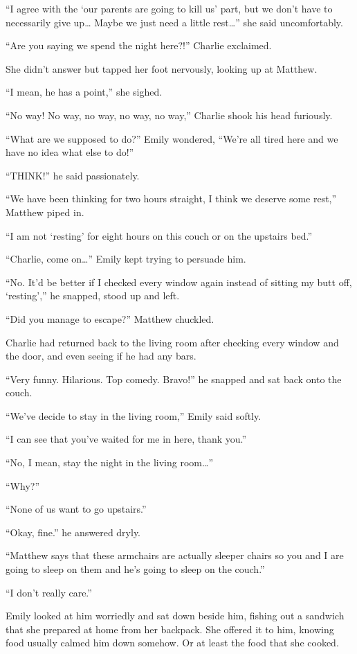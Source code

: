 “I agree with the ‘our parents are going to kill us’ part, but we don’t have to necessarily give up… Maybe we just need a little rest…” she said uncomfortably.

“Are you saying we spend the night here?!” Charlie exclaimed.

She didn’t answer but tapped her foot nervously, looking up at Matthew.

“I mean, he has a point,” she sighed.

“No way! No way, no way, no way, no way,” Charlie shook his head furiously.

“What are we supposed to do?” Emily wondered, “We’re all tired here and we have no idea what else to do!”

“THINK!” he said passionately.

“We have been thinking for two hours straight, I think we deserve some rest,” Matthew piped in.

“I am not ‘resting’ for eight hours on this couch or on the upstairs bed.”

“Charlie, come on…” Emily kept trying to persuade him.

“No. It’d be better if I checked every window again instead of sitting my butt off, ‘resting’,” he snapped, stood up and left.

\bigskip

“Did you manage to escape?” Matthew chuckled.

Charlie had returned back to the living room after checking every window and the door, and even seeing if he had any bars.

“Very funny. Hilarious. Top comedy. Bravo!” he snapped and sat back onto the couch.

“We’ve decide to stay in the living room,” Emily said softly.

“I can see that you’ve waited for me in here, thank you.”

“No, I mean, stay the night in the living room…”

“Why?”

“None of us want to go upstairs.”

“Okay, fine.” he answered dryly.

“Matthew says that these armchairs are actually sleeper chairs so you and I are going to sleep on them and he’s going to sleep on the couch.”

“I don’t really care.”

Emily looked at him worriedly and sat down beside him, fishing out a sandwich that she prepared at home from her backpack. She offered it to him, knowing food usually calmed him down somehow. Or at least the food that she cooked.

